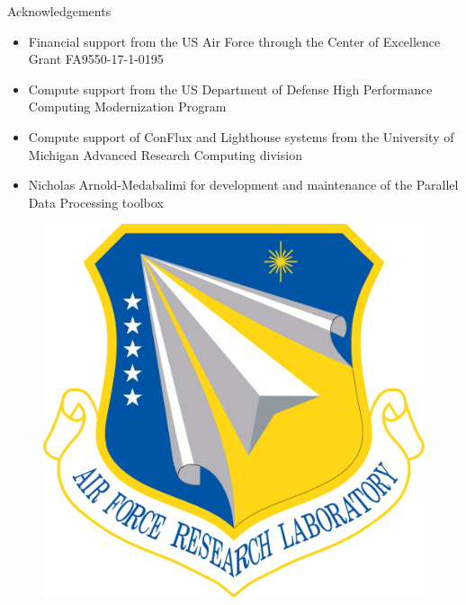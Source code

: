 \documentclass[]{beamer}
\begin{document}
\begin{frame}{Acknowledgements}
	\begin{itemize}
	    \item Financial support from the US Air Force through the Center of Excellence Grant FA9550-17-1-0195
	    \item Compute support from the US Department of Defense High Performance Computing Modernization Program
		\item Compute support of ConFlux and Lighthouse systems from the University of Michigan Advanced Research Computing division
		\item Nicholas Arnold-Medabalimi for development and maintenance of the Parallel Data Processing toolbox
	\end{itemize}
	\begin{minipage}{0.15\linewidth}
		\vspace{0.5em}
		\begin{figure}
			\includegraphics[width=0.99\linewidth]{back_matter/afrlLogo.png}
		\end{figure}
	\end{minipage}
	\begin{minipage}{0.34\linewidth}
		\begin{figure}

\end{figure}
\end{minipage}
\end{frame}
\end{document}

